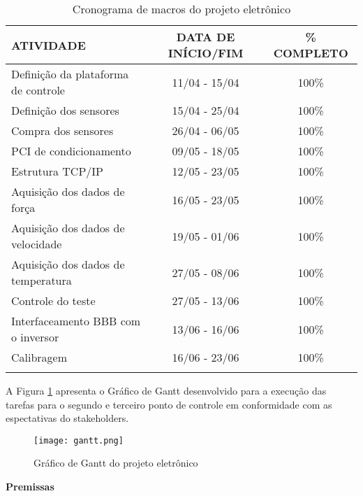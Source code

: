 	\begin{table}[!h]
	\centering
	\caption{Cronograma de macros do projeto eletrônico}
	\begin{tabular}{ l c c }
	\hline
	\textbf{ATIVIDADE}	&	\textbf{DATA DE INÍCIO/FIM} &	\textbf{\% COMPLETO}\\
	\hline
	Definição da plataforma de controle		&	11/04 - 15/04  & 100\% \\
	\hline
	Definição dos sensores					&	15/04 - 25/04  & 100\% \\
	\hline
	Compra dos sensores						&	26/04 - 06/05  & 100\% \\
	\hline
	PCI de condicionamento					&	09/05 - 18/05  & 100\% \\
	\hline
	Estrutura TCP/IP						&	12/05 - 23/05  & 100\% \\
	\hline
	Aquisição dos dados de força			&	16/05 - 23/05  & 100\% \\
	\hline
	Aquisição dos dados de velocidade		&	19/05 - 01/06  & 100\% \\
	\hline
	Aquisição dos dados de temperatura		&	27/05 - 08/06  & 100\% \\
	\hline
	Controle do teste						&	27/05 - 13/06  & 100\% \\
	\hline
	Interfaceamento BBB com o inversor		&	13/06 - 16/06  & 100\% \\
	\hline
	Calibragem								&	16/06 - 23/06  & 100\% \\
	\hline

	\label{cronogramaeletronica}
	\end{tabular}
	\end{table}

	A Figura \ref{gantt} apresenta o Gráfico de Gantt desenvolvido para a execução das tarefas para o segundo e terceiro ponto de controle em conformidade com as espectativas do stakeholders.
	\newpage
	\begin{figure}[!h]
		\centering
		\texttt{[image: gantt.png]}
		\caption{Gráfico de Gantt do projeto eletrônico}
		\label{gantt}
	\end{figure}

	\textbf{Premissas}

